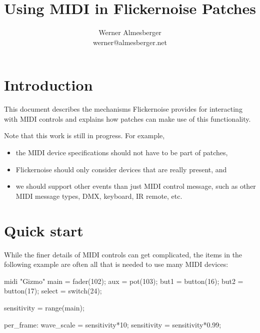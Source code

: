 \documentclass[11pt,a4paper]{article}
\begin{document}
\title{Using MIDI in Flickernoise Patches}
\author{Werner Almesberger \\
  {\normalsize werner@almesberger.net}}

\maketitle




\section{Introduction}

This document describes the mechanisms Flickernoise provides for
interacting with MIDI controls and explains how patches can make use of
this functionality.

Note that this work is still in progress. For example,
\begin{itemize}
  \item the MIDI device specifications should not have to be part of
    patches,
  \item Flickernoise should only consider devices that are really present, and
  \item we should support other events than just MIDI control message,
    such as other MIDI message types, DMX, keyboard, IR remote, etc.
\end{itemize}




\section{Quick start}

While the finer details of MIDI controls can get complicated, the
items in the following example are often all that is needed to
use many MIDI devices:

\begin{listing}{1}
midi "Gizmo" {
	main = fader(102);
	aux = pot(103);
	but1 = button(16);
	but2 = button(17);
	select = switch(24);
}

sensitivity = range(main);

per_frame:
	wave_scale = sensitivity*10;
	sensitivity = sensitivity*0.99;
\end{listing}
\end{document}

